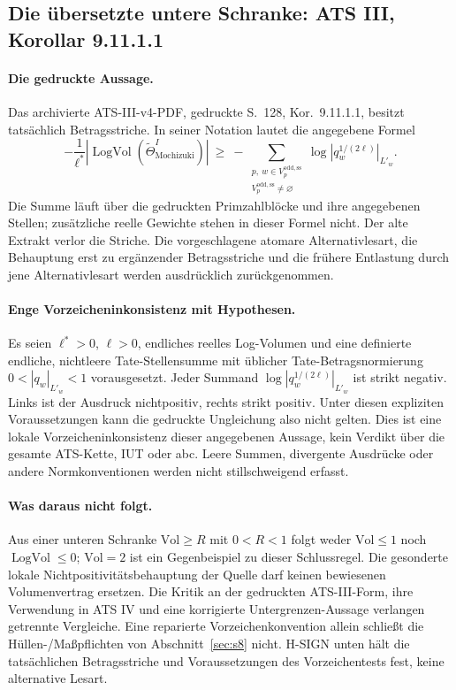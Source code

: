 \documentclass[11pt,a4paper]{article}
\theoremstyle{definition}
\theoremstyle{remark}
\begin{document}
\subsection{Die übersetzte untere Schranke: ATS III, Korollar 9.11.1.1}\label{sec:s7}

\paragraph{Die gedruckte Aussage.}
Das archivierte ATS-III-v4-PDF, gedruckte S.~128, Kor.~9.11.1.1, besitzt
tatsächlich Betragsstriche. In seiner Notation lautet die angegebene Formel
\[
 -\frac{1}{\ell^*}
 \left|\operatorname{LogVol}(\widetilde\Theta^{I}_{\mathrm{Mochizuki}})\right|
 \ \ge\ -\!
 \sum_{\substack{p,\ w\in V_p^{\mathrm{odd,ss}}\\
                  V_p^{\mathrm{odd,ss}}\ne\varnothing}}
 \log\left|q_w^{1/(2\ell)}\right|_{L'_w}.
\]
Die Summe läuft über die gedruckten Primzahlblöcke und ihre angegebenen
Stellen; zusätzliche reelle Gewichte stehen in dieser Formel nicht.
Der alte Extrakt verlor die Striche. Die vorgeschlagene atomare
Alternativlesart, die Behauptung erst zu ergänzender Betragsstriche und
die frühere Entlastung durch jene Alternativlesart werden ausdrücklich
zurückgenommen.

\paragraph{Enge Vorzeicheninkonsistenz mit Hypothesen.}
Es seien $\ell^*>0$, $\ell>0$, endliches reelles Log-Volumen und eine
definierte endliche, nichtleere Tate-Stellensumme mit üblicher
Tate-Betragsnormierung $0<|q_w|_{L'_w}<1$ vorausgesetzt. Jeder Summand
$\log|q_w^{1/(2\ell)}|_{L'_w}$ ist strikt negativ. Links ist der Ausdruck
nichtpositiv, rechts strikt positiv. Unter diesen expliziten Voraussetzungen
kann die gedruckte Ungleichung also nicht gelten. Dies ist eine lokale
Vorzeicheninkonsistenz dieser angegebenen Aussage, kein Verdikt über die
gesamte ATS-Kette, IUT oder abc. Leere Summen, divergente Ausdrücke oder
andere Normkonventionen werden nicht stillschweigend erfasst.

\paragraph{Was daraus nicht folgt.}
Aus einer unteren Schranke $\mathrm{Vol}\ge R$ mit $0<R<1$ folgt weder
$\mathrm{Vol}\le1$ noch $\operatorname{LogVol}\le0$; $\mathrm{Vol}=2$
ist ein Gegenbeispiel zu dieser Schlussregel. Die gesonderte lokale
Nichtpositivitätsbehauptung der Quelle darf keinen bewiesenen Volumenvertrag
ersetzen. Die Kritik an der gedruckten ATS-III-Form, ihre Verwendung in
ATS IV und eine korrigierte Untergrenzen-Aussage verlangen getrennte
Vergleiche. Eine reparierte Vorzeichenkonvention allein schließt die
Hüllen-/Maßpflichten von Abschnitt~\ref{sec:s8} nicht. H-SIGN unten hält
die tatsächlichen Betragsstriche und Voraussetzungen des Vorzeichentests
fest, keine alternative Lesart.
\end{document}
